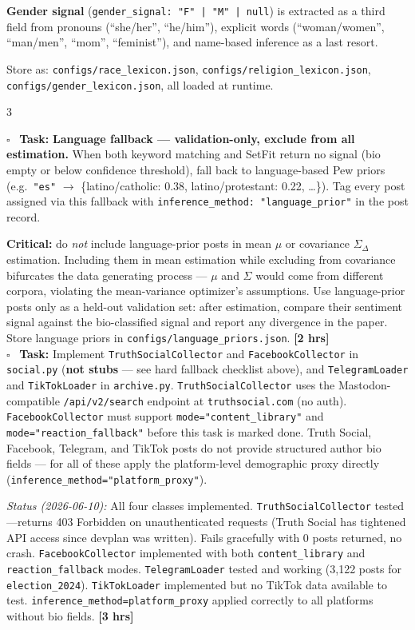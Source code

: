 \documentclass[11pt]{article}
\newcommand{\hrs}[1]{\textbf{[#1 hrs]}}
\newcommand{\task}[2]{%
  \noindent\textbf{Task:} #1 \hfill \hrs{#2}\\}
\newcommand{\done}{\textcolor{sectionblue}{$\square$}\ }
\begin{document}
\begin{taskbox}
{  \textbf{Gender signal} (\texttt{gender\_signal: "F" | "M" | null}) is
  extracted as a third field from pronouns (``she/her'', ``he/him''),
  explicit words (``woman/women'', ``man/men'', ``mom'', ``feminist''), and
  name-based inference as a last resort.

  Store as: \texttt{configs/race\_lexicon.json},
  \texttt{configs/religion\_lexicon.json},
  \texttt{configs/gender\_lexicon.json}, all loaded at runtime.}{3}

\done \task{\textbf{Language fallback --- validation-only, exclude from all estimation.}
  When both keyword matching and SetFit return no signal (bio empty or below
  confidence threshold), fall back to language-based Pew priors (e.g.\
  \texttt{"es"} $\to$ \{latino/catholic: 0.38, latino/protestant: 0.22, \ldots\}).
  Tag every post assigned via this fallback with
  \texttt{inference\_method: "language\_prior"} in the post record.

  \textbf{Critical:} do \emph{not} include language-prior posts in mean $\mu$
  or covariance $\Sigma_\Delta$ estimation. Including them in mean estimation
  while excluding from covariance bifurcates the data generating process ---
  $\mu$ and $\Sigma$ would come from different corpora, violating the
  mean-variance optimizer's assumptions. Use language-prior posts only as a
  held-out validation set: after estimation, compare their sentiment signal
  against the bio-classified signal and report any divergence in the paper.
  Store language priors in \texttt{configs/language\_priors.json}.}{2}

\done \task{Implement \texttt{TruthSocialCollector} and \texttt{FacebookCollector}
  in \texttt{social.py} (\textbf{not stubs} --- see hard fallback checklist above),
  and \texttt{TelegramLoader} and \texttt{TikTokLoader} in \texttt{archive.py}.
  \texttt{TruthSocialCollector} uses the Mastodon-compatible
  \texttt{/api/v2/search} endpoint at \texttt{truthsocial.com} (no auth).
  \texttt{FacebookCollector} must support \texttt{mode="content\_library"}
  and \texttt{mode="reaction\_fallback"} before this task is marked done.
  Truth Social, Facebook, Telegram, and TikTok posts do not provide structured
  author bio fields --- for all of these apply the platform-level demographic
  proxy directly (\texttt{inference\_method="platform\_proxy"}).

  \smallskip\textit{Status (2026-06-10):} All four classes implemented.
  \texttt{TruthSocialCollector} tested---returns 403 Forbidden on
  unauthenticated requests (Truth Social has tightened API access since devplan
  was written). Fails gracefully with 0 posts returned, no crash.
  \texttt{FacebookCollector} implemented with both \texttt{content\_library} and
  \texttt{reaction\_fallback} modes. \texttt{TelegramLoader} tested and working
  (3,122 posts for \texttt{election\_2024}). \texttt{TikTokLoader} implemented
  but no TikTok data available to test.
  \texttt{inference\_method=platform\_proxy} applied correctly to all platforms
  without bio fields.}{3}
\end{taskbox}
\end{document}
